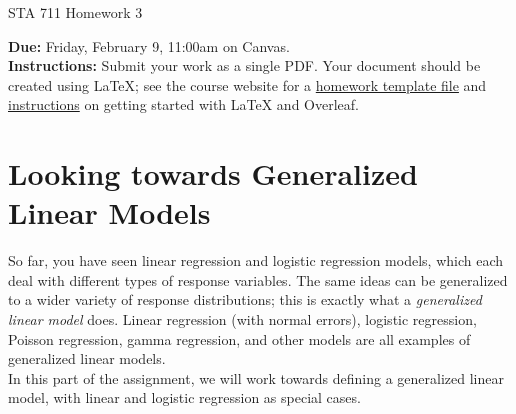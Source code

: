 \documentclass[11pt]{article}
\begin{document}
\begin{center}
\Large
STA 711 Homework 3\\
\normalsize
\vspace{5mm}
\end{center}

\noindent \textbf{Due:} Friday, February 9, 11:00am on Canvas.\\ 

\noindent \textbf{Instructions:} Submit your work as a single PDF. Your document should be created using LaTeX; see the course website for a \href{https://sta711-s24.github.io/homework/hw_template.tex}{homework template file} and \href{https://sta711-s24.github.io/homework/latex_instructions/}{instructions} on getting started with LaTeX and Overleaf.

\section*{Looking towards Generalized Linear Models}

So far, you have seen linear regression and logistic regression models, which each deal with different types of response variables. The same ideas can be generalized to a wider variety of response distributions; this is exactly what a \textit{generalized linear model} does. Linear regression (with normal errors), logistic regression, Poisson regression, gamma regression, and other models are all examples of generalized linear models.\\

\noindent In this part of the assignment, we will work towards defining a generalized linear model, with linear and logistic regression as special cases.
\end{document}
